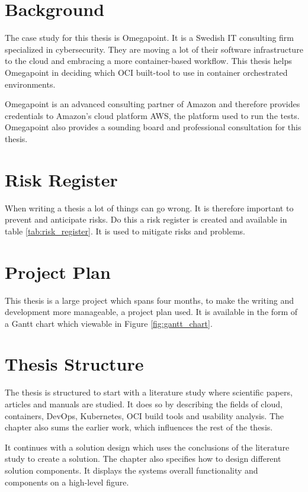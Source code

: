 \section{Background}
The case study for this thesis is Omegapoint. It is a Swedish IT consulting firm specialized in cybersecurity. They are moving a lot of their software infrastructure to the cloud and embracing a more container-based workflow. This thesis helps Omegapoint in deciding which OCI built-tool to use in container orchestrated environments. 

Omegapoint is an advanced consulting partner of Amazon and therefore provides credentials to Amazon's cloud platform AWS, the platform used to run the tests. Omegapoint also provides a sounding board and professional consultation for this thesis. 

\section{Risk Register}
When writing a thesis a lot of things can go wrong. It is therefore important to prevent and anticipate risks. Do this a risk register is created and available in table \ref{tab:risk_register}. It is used to mitigate risks and problems.

\begin{landscape}

\end{landscape}

\section{Project Plan}
This thesis is a large project which spans four months, to make the writing and development more manageable, a project plan used. It is available in the form of a Gantt chart which viewable in Figure \ref{fig:gantt_chart}.



\section{Thesis Structure}
The thesis is structured to start with a literature study where scientific papers, articles and manuals are studied. It does so by describing the fields of cloud, containers, DevOps, Kubernetes, OCI build tools and usability analysis. The chapter also sums the earlier work, which influences the rest of the thesis. 

It continues with a solution design which uses the conclusions of the literature study to create a solution. The chapter also specifies how to design different solution components. It displays the systems overall functionality and components on a high-level figure.

